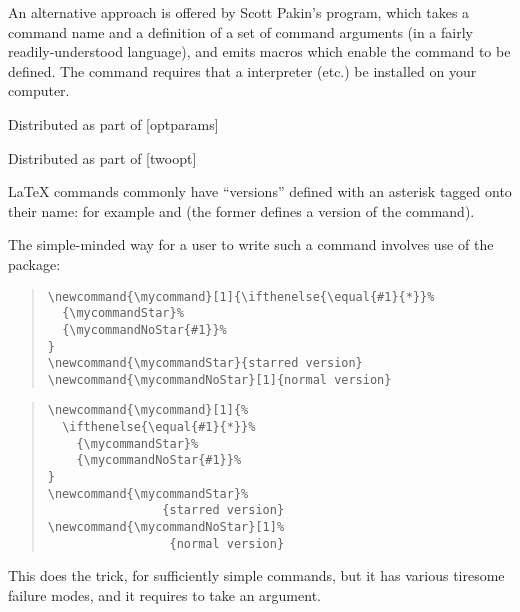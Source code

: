 An alternative approach is offered by Scott Pakin's
 program, which takes a command name and a
definition of a set of command arguments (in a fairly
readily-understood language), and emits \AllTeX{} macros which enable
the command to be defined.  The command requires that a
 interpreter (etc.\@) be installed on your computer.
\begin{ctanrefs}
\item[newcommand.py]
\item[optparams.sty]Distributed as part of [optparams]
\item[twoopt.sty]Distributed as part of [twoopt]
\item[xargs.sty]
\item[xkeyval.sty]
\end{ctanrefs}


\LaTeX{} commands commonly have ``versions'' defined with an asterisk
tagged onto their name: for example  and
 (the former defines a  version of the
command).

The simple-minded way for a user to write such a command involves use
of the  package:
\begin{wideversion}
\begin{quote}
\begin{verbatim}
\newcommand{\mycommand}[1]{\ifthenelse{\equal{#1}{*}}%
  {\mycommandStar}%
  {\mycommandNoStar{#1}}%
}
\newcommand{\mycommandStar}{starred version}
\newcommand{\mycommandNoStar}[1]{normal version}
\end{verbatim}
\end{quote}
\end{wideversion}
\begin{narrowversion}
\begin{quote}
\begin{verbatim}
\newcommand{\mycommand}[1]{%
  \ifthenelse{\equal{#1}{*}}%
    {\mycommandStar}%
    {\mycommandNoStar{#1}}%
}
\newcommand{\mycommandStar}%
                {starred version}
\newcommand{\mycommandNoStar}[1]%
                 {normal version}
\end{verbatim}
\end{quote}
\end{narrowversion}
This does the trick, for sufficiently simple commands, but it has
various tiresome failure modes, and it requires 
to take an argument.

